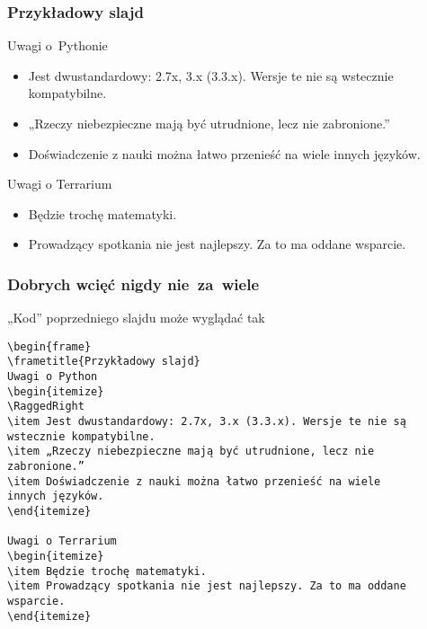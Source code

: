 \documentclass[10pt,t]{beamer}
\begin{document}
\begin{frame}
  \frametitle{Przykładowy slajd}


  Uwagi o~Pythonie
  \begin{itemize}
    \RaggedRight

  \item Jest dwustandardowy: 2.7x, 3.x (3.3.x). Wersje te nie są
    wstecznie kompatybilne.

  \item „Rzeczy niebezpieczne mają być utrudnione, lecz nie
    zabronione.”

  \item Doświadczenie z nauki można łatwo przenieść na wiele
    innych języków.

  \end{itemize}



  Uwagi o Terrarium
  \begin{itemize}
    \RaggedRight

  \item Będzie trochę matematyki.

  \item Prowadzący spotkania nie jest najlepszy. Za to ma oddane
    wsparcie.

  \end{itemize}

\end{frame}





\begin{frame}[fragile]
  \frametitle{Dobrych wcięć nigdy nie~za~wiele}


  „Kod” poprzedniego slajdu może wyglądać tak

  \begingroup

  \tiny

\begin{verbatim}
\begin{frame}
\frametitle{Przykładowy slajd}
Uwagi o Python
\begin{itemize}
\RaggedRight
\item Jest dwustandardowy: 2.7x, 3.x (3.3.x). Wersje te nie są
wstecznie kompatybilne.
\item „Rzeczy niebezpieczne mają być utrudnione, lecz nie
zabronione.”
\item Doświadczenie z nauki można łatwo przenieść na wiele
innych języków.
\end{itemize}

Uwagi o Terrarium
\begin{itemize}
\item Będzie trochę matematyki.
\item Prowadzący spotkania nie jest najlepszy. Za to ma oddane wsparcie.
\end{itemize}
\end{verbatim}

\endgroup

\end{frame}
\end{document}
